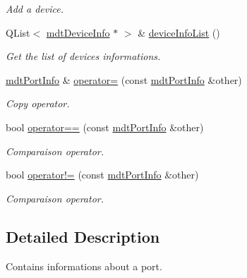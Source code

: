 \begin{DoxyCompactItemize}
\begin{DoxyCompactList}\small\item\em Add a device. \end{DoxyCompactList}\item 
QList$<$ \hyperlink{classmdt_device_info}{mdtDeviceInfo} $\ast$ $>$ \& \hyperlink{classmdt_port_info_a22013ea9e2de1d12cef673a2452d5b80}{deviceInfoList} ()
\begin{DoxyCompactList}\small\item\em Get the list of devices informations. \end{DoxyCompactList}\item 
\hypertarget{classmdt_port_info_a88bab5da09191b1ecfbb0b11f001ad24}{
\hyperlink{classmdt_port_info}{mdtPortInfo} \& \hyperlink{classmdt_port_info_a88bab5da09191b1ecfbb0b11f001ad24}{operator=} (const \hyperlink{classmdt_port_info}{mdtPortInfo} \&other)}
\label{classmdt_port_info_a88bab5da09191b1ecfbb0b11f001ad24}

\begin{DoxyCompactList}\small\item\em Copy operator. \end{DoxyCompactList}\item 
\hypertarget{classmdt_port_info_a72b265f3461d764d0e902c421e3b43e4}{
bool \hyperlink{classmdt_port_info_a72b265f3461d764d0e902c421e3b43e4}{operator==} (const \hyperlink{classmdt_port_info}{mdtPortInfo} \&other)}
\label{classmdt_port_info_a72b265f3461d764d0e902c421e3b43e4}

\begin{DoxyCompactList}\small\item\em Comparaison operator. \end{DoxyCompactList}\item 
\hypertarget{classmdt_port_info_a8a198e8693bb328194ac7bba4a29271e}{
bool \hyperlink{classmdt_port_info_a8a198e8693bb328194ac7bba4a29271e}{operator!=} (const \hyperlink{classmdt_port_info}{mdtPortInfo} \&other)}
\label{classmdt_port_info_a8a198e8693bb328194ac7bba4a29271e}

\begin{DoxyCompactList}\small\item\em Comparaison operator. \end{DoxyCompactList}\end{DoxyCompactItemize}


\subsection{Detailed Description}
Contains informations about a port. 

